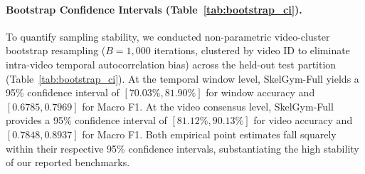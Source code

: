 \documentclass[preprint,12pt]{elsarticle}
\begin{document}
\paragraph{Bootstrap Confidence Intervals (Table~\ref{tab:bootstrap_ci}).}
To quantify sampling stability, we conducted non-parametric video-cluster bootstrap resampling ($B=1,000$ iterations, clustered by video ID to eliminate intra-video temporal autocorrelation bias) across the held-out test partition (Table~\ref{tab:bootstrap_ci}). At the temporal window level, SkelGym-Full yields a 95\% confidence interval of $[70.03\%, 81.90\%]$ for window accuracy and $[0.6785, 0.7969]$ for Macro F1. At the video consensus level, SkelGym-Full provides a 95\% confidence interval of $[81.12\%, 90.13\%]$ for video accuracy and $[0.7848, 0.8937]$ for Macro F1. Both empirical point estimates fall squarely within their respective 95\% confidence intervals, substantiating the high stability of our reported benchmarks.
\end{document}
